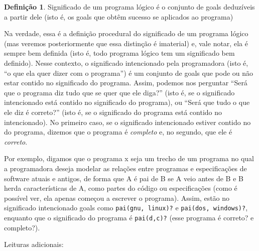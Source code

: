 \documentclass{article}
\theoremstyle{definition}
\newtheorem{definition}{Definição}[section]
\theoremstyle{remark}
\begin{document}
  \theoremstyle{definition}
  \begin{definition}{Significado}
    de um programa lógico é o conjunto de goals deduzíveis a partir dele (isto é, os goals que obtêm sucesso se aplicados ao programa)
  \end{definition}

  Na verdade, essa é a definição procedural do significado de um programa lógico (mas veremos posteriormente que essa distinção é imaterial) e, vale notar, ela é sempre bem definida (isto é, todo programa lógico tem um significado bem definido). Nesse contexto, o significado intencionado pela programadora (isto é, ``o que ela quer dizer com o programa'') é um conjunto de goals que pode ou não estar contido no significado do programa. Assim, podemos nos perguntar ``Será que o
  programa diz tudo que se quer que ele diga?'' (isto é, se o significado intencionado está contido no significado do programa), ou ``Será que tudo o que ele diz é correto?'' (isto é, se o significado do programa está contido no intencionado). No primeiro caso, se o significado intencionado estiver contido no do programa, dizemos que o programa é \textit{completo} e, no segundo, que ele é \textit{correto}.

  Por exemplo, digamos que o programa x seja um trecho de um programa no qual a programadora deseja modelar as relações entre programas e especificações de software atuais e antigos, de forma que A é pai de B se A veio antes de B e B herda características de A, como partes do código ou especificações (como é possível ver, ela apenas começou a escrever o programa). Assim, estão no significado intencionado goals como {\tt pai(gnu, linux)?} e {\tt pai(dos, windows)?}, enquanto que o
  significado do programa é {\tt pai(d,c)?} (esse programa é correto? e completo?).


  Leituras adicionais:
\end{document}
